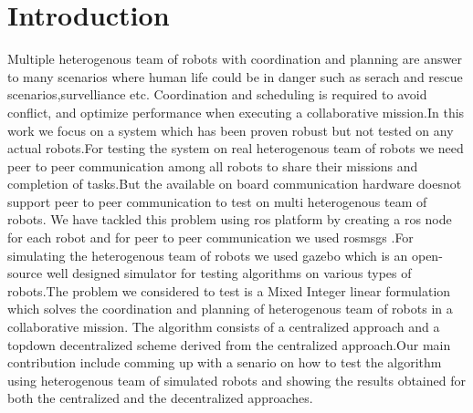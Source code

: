 \documentclass[conference]{IEEEtran}
\begin{document}

%
\IEEEpeerreviewmaketitle



\section{Introduction}
Multiple heterogenous team of robots with coordination and planning are answer to many scenarios where human life could be in danger such as serach and rescue scenarios,survelliance etc. Coordination and scheduling is required to avoid conflict, and optimize performance when executing a collaborative mission.In this work we focus on a system which has been proven robust but not tested on any actual robots.For testing the system on real heterogenous team of robots we need peer to peer communication among all robots to share their missions and completion of tasks.But the available on board communication hardware doesnot support peer to peer communication to test on multi heterogenous team of robots. We have tackled this problem using ros platform by creating a ros node for each robot and for peer to peer communication we used rosmsgs .For simulating the heterogenous team of robots we used gazebo which is an open-source well designed simulator for testing algorithms on various types of robots.The problem we considered to test is a Mixed Integer linear formulation which solves the coordination and planning of heterogenous team of robots in a collaborative mission.
The algorithm consists of a centralized approach and a topdown decentralized scheme derived from the centralized approach.Our main contribution include comming up with a senario on how to test the algorithm using heterogenous team of simulated robots and showing the results obtained for both the centralized and the decentralized approaches.  
\end{document}
